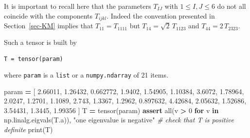 \documentclass[
  a4paper,
  numbers=noendperiod,
  DIV=12]{scrreprt}
\newenvironment{Shaded}{\begin{snugshade}}{\end{snugshade}}
\newcommand{\BuiltInTok}[1]{#1}
\newcommand{\CommentTok}[1]{\textcolor[rgb]{0.56,0.35,0.01}{\textit{#1}}}
\newcommand{\ControlFlowTok}[1]{\textcolor[rgb]{0.13,0.29,0.53}{\textbf{#1}}}
\newcommand{\DecValTok}[1]{\textcolor[rgb]{0.00,0.00,0.81}{#1}}
\newcommand{\FloatTok}[1]{\textcolor[rgb]{0.00,0.00,0.81}{#1}}
\newcommand{\KeywordTok}[1]{\textcolor[rgb]{0.13,0.29,0.53}{\textbf{#1}}}
\newcommand{\NormalTok}[1]{#1}
\newcommand{\OperatorTok}[1]{\textcolor[rgb]{0.81,0.36,0.00}{\textbf{#1}}}
\newcommand{\StringTok}[1]{\textcolor[rgb]{0.31,0.60,0.02}{#1}}
\begin{document}
\begin{tcolorbox}[enhanced jigsaw, arc=.35mm, bottomrule=.15mm, bottomtitle=1mm, breakable, colback=white, colbacktitle=quarto-callout-warning-color!10!white, colframe=quarto-callout-warning-color-frame, coltitle=black, left=2mm, leftrule=.75mm, opacityback=0, opacitybacktitle=0.6, rightrule=.15mm, title=\textcolor{quarto-callout-warning-color}{\faExclamationTriangle}\hspace{0.5em}{Warning}, titlerule=0mm, toprule=.15mm, toptitle=1mm]

It is important to recall here that the parameters \(T_{IJ}\) with
\(1\leq I,J\leq 6\) do not all coincide with the components
\(T_{ijkl}\). Indeed the convention presented in Section~\ref{sec-KM}
implies that \(T_{11}=T_{1111}\) but \(T_{14}=\sqrt{2}\,T_{1123}\) and
\(T_{44}=2\,T_{2323}\).

\end{tcolorbox}

Such a tensor is built by

\texttt{T\ =\ tensor(param)}

where \texttt{param} is a \texttt{list} or a \texttt{numpy.ndarray} of
21 items.

\begin{Shaded}
\begin{Highlighting}[]
\NormalTok{param }\OperatorTok{=}\NormalTok{ [ }\FloatTok{2.66011}\NormalTok{, }\FloatTok{1.26432}\NormalTok{, }\FloatTok{0.662772}\NormalTok{, }\FloatTok{1.9402}\NormalTok{, }\FloatTok{1.54905}\NormalTok{, }\FloatTok{1.10384}\NormalTok{, }\FloatTok{3.6072}\NormalTok{, }\FloatTok{1.78964}\NormalTok{, }\FloatTok{2.0247}\NormalTok{, }\FloatTok{1.2701}\NormalTok{, }\FloatTok{1.1089}\NormalTok{, }\FloatTok{2.743}\NormalTok{, }\FloatTok{1.3367}\NormalTok{, }\FloatTok{1.2962}\NormalTok{, }\FloatTok{0.897632}\NormalTok{, }\FloatTok{4.42684}\NormalTok{, }\FloatTok{2.05632}\NormalTok{, }\FloatTok{1.52686}\NormalTok{, }\FloatTok{3.54431}\NormalTok{, }\FloatTok{1.3445}\NormalTok{, }\FloatTok{1.99356}\NormalTok{ ]}
\NormalTok{T }\OperatorTok{=}\NormalTok{ tensor(param)}
\ControlFlowTok{assert} \BuiltInTok{all}\NormalTok{(v }\OperatorTok{\textgreater{}} \DecValTok{0} \ControlFlowTok{for}\NormalTok{ v }\KeywordTok{in}\NormalTok{ np.linalg.eigvals(T.a)), }\StringTok{"one eigenvalue is negative"} \CommentTok{\# check that T is positive definite}
\BuiltInTok{print}\NormalTok{(T)}
\end{Highlighting}
\end{Shaded}
\end{document}
